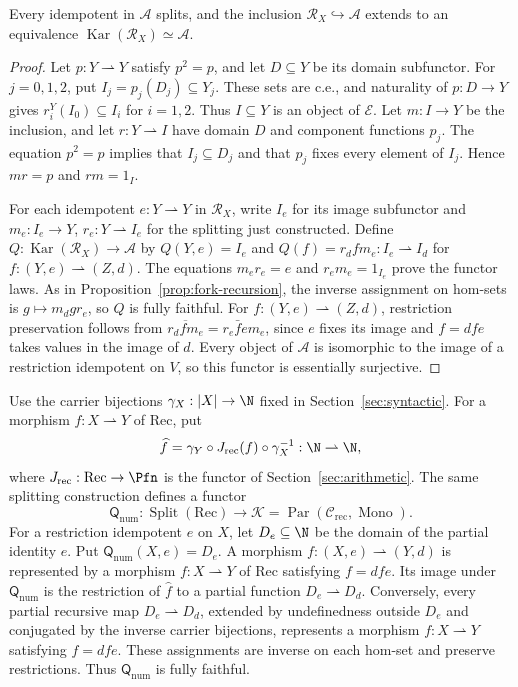 \begin{corollary}\label{cor:fork-karoubi}
Every idempotent in $\mathcal A$ splits, and the inclusion
$\mathscr R_X\hookrightarrow\mathcal A$ extends to an equivalence
$\operatorname{Kar}(\mathscr R_X)\simeq\mathcal A$.
\end{corollary}
\begin{proof}
Let $p:Y\rightharpoonup Y$ satisfy $p^2=p$, and let
$D\subseteq Y$ be its domain subfunctor. For $j=0,1,2$, put
$I_j=p_j(D_j)\subseteq Y_j$. These sets are c.e., and naturality
of $p:D\to Y$ gives $r_i^Y(I_0)\subseteq I_i$ for $i=1,2$.
Thus $I\subseteq Y$ is an object of $\mathcal E$.
Let $m:I\to Y$ be the inclusion, and let
$r:Y\rightharpoonup I$ have domain $D$ and component functions $p_j$.
The equation $p^2=p$ implies that $I_j\subseteq D_j$ and that
$p_j$ fixes every element of $I_j$. Hence $mr=p$ and $rm=1_I$.

For each idempotent $e:Y\rightharpoonup Y$ in $\mathscr R_X$, write
$I_e$ for its image subfunctor and
$m_e:I_e\to Y$, $r_e:Y\rightharpoonup I_e$ for the splitting just
constructed. Define
$Q:\operatorname{Kar}(\mathscr R_X)\to\mathcal A$ by
$Q(Y,e)=I_e$ and
$Q(f)=r_d f m_e:I_e\rightharpoonup I_d$ for
$f:(Y,e)\rightharpoonup(Z,d)$.
The equations $m_er_e=e$ and $r_em_e=1_{I_e}$ prove the functor
laws. As in Proposition~\ref{prop:fork-recursion}, the inverse
assignment on hom-sets is $g\mapsto m_d g r_e$, so $Q$ is fully faithful.
For $f:(Y,e)\rightharpoonup(Z,d)$, restriction preservation follows from
$\overline{r_d f m_e}=r_e\bar f e m_e$, since $e$ fixes its image
and $f=dfe$ takes values in the image of $d$.
Every object of $\mathcal A$ is isomorphic to the image of a restriction
idempotent on $V$, so this functor is essentially surjective.
\end{proof}

Use the carrier bijections $\gamma_X:|X|\to\N$ fixed in
Section~\ref{sec:syntactic}. For a morphism $f:X\rightharpoonup Y$
of $\mathrm{Rec}$, put
\[
 \widehat f=\gamma_Y\circ J_{\mathrm{rec}}(f)\circ\gamma_X^{-1}
 :\N\rightharpoonup\N,
\]
where $J_{\mathrm{rec}}:\mathrm{Rec}\to\Pfn$ is the functor of
Section~\ref{sec:arithmetic}. The same splitting construction
defines a functor
\[
 \mathsf Q_{\mathrm{num}}:\operatorname{Split}(\mathrm{Rec})
 \longrightarrow\mathcal K
 =\operatorname{Par}(\mathcal C_{\mathrm{rec}},\operatorname{Mono}).
\]
For a restriction idempotent $e$ on $X$, let $D_e\subseteq\N$
be the domain of the partial identity $\widehat e$.
Put $\mathsf Q_{\mathrm{num}}(X,e)=D_e$.
A morphism $f:(X,e)\rightharpoonup(Y,d)$ is represented by a morphism
$f:X\rightharpoonup Y$ of $\mathrm{Rec}$ satisfying $f=dfe$.
Its image under $\mathsf Q_{\mathrm{num}}$ is the restriction of
$\widehat f$ to a partial function $D_e\rightharpoonup D_d$.
Conversely, every partial recursive map $D_e\rightharpoonup D_d$,
extended by undefinedness outside $D_e$ and conjugated by the
inverse carrier bijections, represents a morphism
$f:X\rightharpoonup Y$ satisfying $f=dfe$. These assignments are
inverse on each hom-set and preserve restrictions. Thus
$\mathsf Q_{\mathrm{num}}$ is fully faithful.


